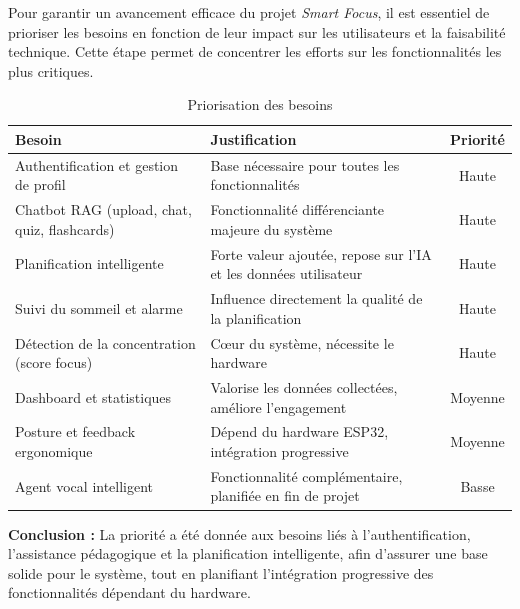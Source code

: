 \documentclass[12pt,a4paper]{report}
\begin{document}
Pour garantir un avancement efficace du projet \textit{Smart Focus}, il est essentiel de prioriser les besoins en fonction de leur impact sur les utilisateurs et la faisabilité technique. Cette étape permet de concentrer les efforts sur les fonctionnalités les plus critiques.

\vspace{0.5em}
\begin{table}[H]
    \centering
    \caption{Priorisation des besoins}
    \label{tab:priorisation_besoins}
    \renewcommand{\arraystretch}{1.3}
    \begin{tabular}{|p{5cm}|p{6.5cm}|c|}
        \hline
        \textbf{Besoin} & \textbf{Justification} & \textbf{Priorité} \\ \hline
        Authentification et gestion de profil & Base nécessaire pour toutes les fonctionnalités & Haute \\ \hline
        Chatbot \ac{RAG} (upload, chat, quiz, flashcards) & Fonctionnalité différenciante majeure du système & Haute \\ \hline
        Planification intelligente & Forte valeur ajoutée, repose sur l'\ac{IA} et les données utilisateur & Haute \\ \hline
        Suivi du sommeil et alarme & Influence directement la qualité de la planification & Haute \\ \hline
        Détection de la concentration (score focus) & Cœur du système, nécessite le hardware & Haute \\ \hline
        Dashboard et statistiques & Valorise les données collectées, améliore l'engagement & Moyenne \\ \hline
        Posture et feedback ergonomique & Dépend du hardware ESP32, intégration progressive & Moyenne \\ \hline
        Agent vocal intelligent & Fonctionnalité complémentaire, planifiée en fin de projet & Basse \\ \hline
    \end{tabular}
\end{table}

\vspace{1em}
\noindent\colorbox{gray!15}{%
    \parbox{\dimexpr\linewidth-2\fboxsep}{%
        \textbf{Conclusion :} La priorité a été donnée aux besoins liés à l'authentification, l'assistance pédagogique et la planification intelligente, afin d'assurer une base solide pour le système, tout en planifiant l'intégration progressive des fonctionnalités dépendant du hardware.
    }%
}
\end{document}
